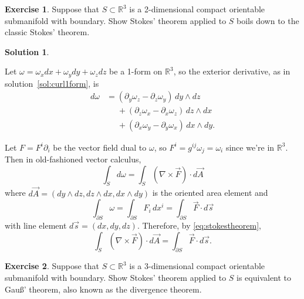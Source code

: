 \documentclass[11pt, a4paper]{report}
\theoremstyle{definition}
\newtheorem{ex}{Exercise}[part]
\newtheorem{sol}{Solution}[part]
\begin{document}
\begin{ex}

Suppose that $S \subset \mathbb{R}^3$ is a 2-dimensional compact orientable submanifold with boundary.
Show Stokes' theorem applied to $S$ boils down to the classic Stokes' theorem.

\end{ex}

\begin{sol}\label{sol:classicstokestheorem}

Let $\omega = \omega_x dx + \omega_y dy + \omega_z dz$ be a 1-form on $\mathbb{R}^3$, so the exterior derivative, as in solution~\ref{sol:curl1form}, is
\begin{align*}
    d\omega &= (\partial_y \omega_z - \partial_z \omega_y) \, dy \wedge dz \\
        &\mathrel{\phantom{=}}{} + (\partial_z \omega_x - \partial_x \omega_z) \, dz \wedge dx \\
        &\mathrel{\phantom{=}}{} + (\partial_x \omega_y - \partial_y \omega_x) \, dx \wedge dy.
\end{align*}


Let $F = F^i \partial_i$ be the vector field dual to $\omega$, so $F^i = g^{ij} \omega_j = \omega_i$ since we're in $\mathbb{R}^3$. Then in old-fashioned vector calculus,
\[
    \int_S d\omega = \int_S (\nabla \times \vec{F}) \cdot d\vec{A}
\]
where $d\vec{A} = (dy \wedge dz, dz \wedge dx, dx \wedge dy)$ is the oriented area element
and
\[
    \int_{\partial S} \omega = \int_{\partial S} F_i \, dx^i
                             = \int_{\partial S} \vec{F} \cdot d\vec{s}
\]
with line element $d\vec{s} = (dx, dy, dz)$.
Therefore, by \ref{eq:stokestheorem}, %
\[
    \int_S (\nabla \times \vec{F}) \cdot d\vec{A} = \int_{\partial S} \vec{F} \cdot d\vec{s}.
\]

\end{sol}

\begin{ex}

Suppose that $S \subset \mathbb{R}^3$ is a 3-dimensional compact orientable submanifold with boundary.
Show Stokes' theorem applied to $S$ is equivalent to Gau\ss' theorem, also known as the divergence theorem.

\end{ex}
\end{document}
